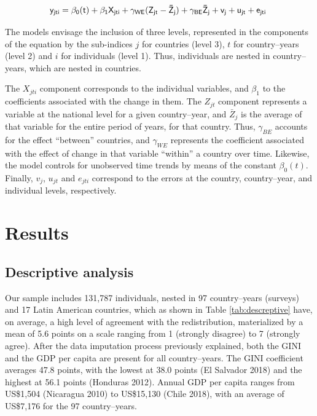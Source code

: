 \documentclass[utf8]{frontiersSCNS} %
\begin{document}
\begin{equation}
\small\sf\centering
y_{jti} = \beta_{0}(t) + \beta_1X_{jti} + \gamma_{WE}(Z_{jt} - \bar{Z}_{j}) + \gamma_{BE}\bar{Z}_{j} + v_{j} + u_{jt} + e_{jti} \
\label{eq:formula}
\end{equation}

The models envisage the inclusion of three levels, represented in the components of the equation by the sub-indices $j$ for countries (level 3), $t$ for country–years (level 2) and $i$ for individuals (level 1). Thus, individuals are nested in country–years, which are nested in countries.

The $X_{jti}$ component corresponds to the individual variables, and $\beta_1$ to the coefficients associated with the change in them. The $Z_{jt}$ component represents a variable at the national level for a given country–year, and $\bar{Z}_{j}$ is the average of that variable for the entire period of years, for that country. Thus, $\gamma_{BE}$ accounts for the effect “between” countries, and $\gamma_{WE}$ represents the coefficient associated with the effect of change in that variable “within” a country over time. Likewise, the model controls for unobserved time trends by means of the constant $\beta_{0}(t)$. Finally, $v_{j}$,  $u_{jt}$ and $e_{jti}$ correspond to the errors at the country, country–year, and individual levels, respectively.

\section{Results}

\subsection{Descriptive analysis}

Our sample includes 131,787 individuals, nested in 97 country–years (surveys) and 17 Latin American countries, which as shown in Table \ref{tab:descreptive} have, on average, a high level of agreement with the redistribution, materialized by a mean of 5.6 points on a scale ranging from 1 (strongly disagree) to 7 (strongly agree). After the data imputation process previously explained, both the GINI and the GDP per capita are present for all country–years. The GINI coefficient averages 47.8 points, with the lowest at 38.0 points (El Salvador 2018) and the highest at 56.1 points (Honduras 2012). Annual GDP per capita ranges from US\$1,504 (Nicaragua 2010) to US\$15,130 (Chile 2018), with an average of US\$7,176 for the 97 country–years.
\end{document}
